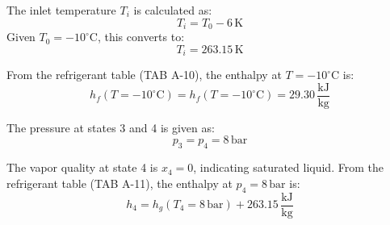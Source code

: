 The inlet temperature \(T_i\) is calculated as:  
\[
T_i = T_0 - 6 \, \text{K}
\]  
Given \(T_0 = -10^\circ\text{C}\), this converts to:  
\[
T_i = 263.15 \, \text{K}
\]  

From the refrigerant table (TAB A-10), the enthalpy at \(T = -10^\circ\text{C}\) is:  
\[
h_f(T = -10^\circ\text{C}) = h_f(T = -10^\circ\text{C}) = 29.30 \, \frac{\text{kJ}}{\text{kg}}
\]  

The pressure at states 3 and 4 is given as:  
\[
p_3 = p_4 = 8 \, \text{bar}
\]  

The vapor quality at state 4 is \(x_4 = 0\), indicating saturated liquid. From the refrigerant table (TAB A-11), the enthalpy at \(p_4 = 8 \, \text{bar}\) is:  
\[
h_4 = h_g(T_4 = 8 \, \text{bar}) + 263.15 \, \frac{\text{kJ}}{\text{kg}}
\]